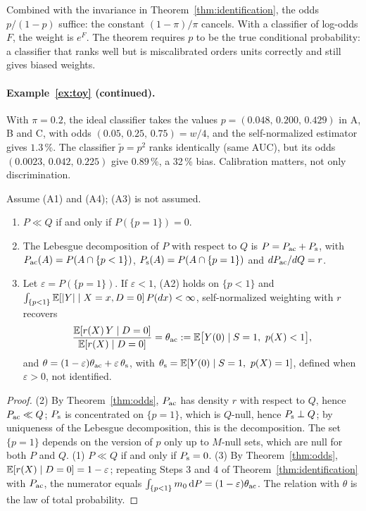 Combined with the invariance in Theorem~\ref{thm:identification}, the odds $p/(1-p)$ suffice: the constant $(1-\pi)/\pi$ cancels. With a classifier of log-odds $F$, the weight is $e^{F}$. The theorem requires $p$ to be the true conditional probability: a classifier that ranks well but is miscalibrated orders units correctly and still gives biased weights.

\paragraph{Example~\ref{ex:toy} (continued).}
With $\pi=0.2$, the ideal classifier takes the values $p=(0.048,\,0.200,\,0.429)$ in A, B and C, with odds $(0.05,\,0.25,\,0.75)=w/4$, and the self-normalized estimator gives $1.3\,\%$. The classifier $\tilde p=p^2$ ranks identically (same AUC), but its odds $(0.0023,\,0.042,\,0.225)$ give $0.89\,\%$, a 32\,\% bias. Calibration matters, not only discrimination.


\begin{theorem}\label{thm:lebesgue}
Assume (A1) and (A4); (A3) is not assumed.
\begin{enumerate}
  \item $P\ll Q$ if and only if $P(\{p=1\})=0$.
  \item The Lebesgue decomposition of $P$ with respect to $Q$ is $P=P_{\mathrm{ac}}+P_{\mathrm{s}}$, with $P_{\mathrm{ac}}(A)=P(A\cap\{p<1\})$, $P_{\mathrm{s}}(A)=P(A\cap\{p=1\})$ and $dP_{\mathrm{ac}}/dQ=r$.
  \item Let $\varepsilon=P(\{p=1\})$. If $\varepsilon<1$, (A2) holds on $\{p<1\}$ and $\int_{\{p<1\}}\mathbb{E}[|Y|\mid X=x,D=0]\,P(dx)<\infty$, self-normalized weighting with $r$ recovers
  \[
  \frac{\E[r(X)\,Y\mid D=0]}{\E[r(X)\mid D=0]}=\thac:=\E\bigl[Y(0)\mid S=1,\ p(X)<1\bigr],
  \]
  and $\theta=(1-\varepsilon)\theta_{\mathrm{ac}}+\varepsilon\,\theta_{\mathrm{s}}$, with $\theta_{\mathrm{s}}=\mathbb{E}[Y(0)\mid S=1,\ p(X)=1]$, defined when $\varepsilon>0$, not identified.
\end{enumerate}
\end{theorem}
\begin{proof}
(2) By Theorem~\ref{thm:odds}, $P_{\mathrm{ac}}$ has density $r$ with respect to $Q$, hence $P_{\mathrm{ac}}\ll Q$; $P_{\mathrm{s}}$ is concentrated on $\{p=1\}$, which is $Q$-null, hence $P_{\mathrm{s}}\perp Q$; by uniqueness of the Lebesgue decomposition, this is the decomposition. The set $\{p=1\}$ depends on the version of $p$ only up to $M$-null sets, which are null for both $P$ and $Q$. (1) $P\ll Q$ if and only if $P_{\mathrm{s}}=0$. (3) By Theorem~\ref{thm:odds}, $\mathbb{E}[r(X)\mid D=0]=1-\varepsilon$; repeating Steps 3 and 4 of Theorem~\ref{thm:identification} with $P_{\mathrm{ac}}$, the numerator equals $\int_{\{p<1\}}m_0\,\mathrm{d} P=(1-\varepsilon)\theta_{\mathrm{ac}}$. The relation with $\theta$ is the law of total probability.
\end{proof}

